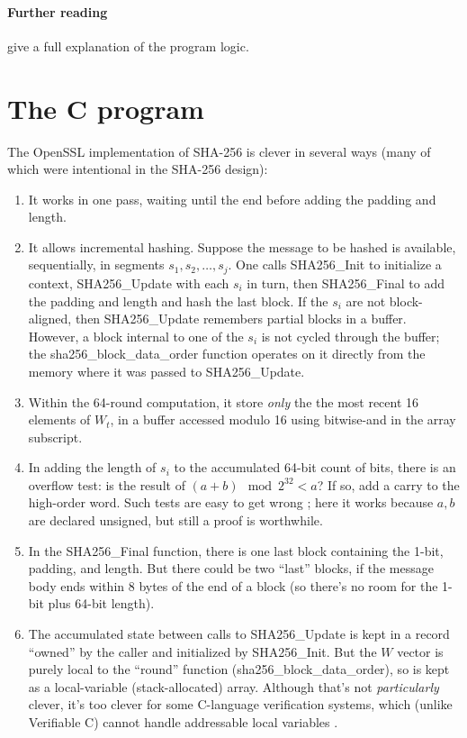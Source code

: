 \documentclass[prodmode,acmtoplas]{acmsmall}
\begin{document}
\paragraph{Further reading}
 give a full explanation of
the program logic.

\section{The C program}

The OpenSSL implementation of SHA-256 is clever
in several ways (many of which were 
intentional in the SHA-256 design):
\begin{enumerate}
\item It works in one pass, waiting until the end
before adding the padding and length.
\item It allows incremental hashing.  Suppose
the message to be hashed is available,
sequentially, in segments $s_1,s_2,\ldots,s_j$.
One calls \textsf{SHA256\_Init} to initialize
a context, \textsf{SHA256\_Update} with
each $s_i$ in turn, then
\textsf{SHA256\_Final} to add the padding
and length and hash the last block.
If the $s_i$ are not block-aligned,
then \textsf{SHA256\_Update} remembers
partial blocks in a buffer.  However,
a block internal to one of the $s_i$ is
not cycled through the buffer; the 
\textsf{sha256\_block\_data\_order}
function operates on it directly from the
memory where it was passed to 
\textsf{SHA256\_Update}.
\item Within the 64-round computation,
it store \emph{only} the
the most recent 16 elements of $W_t$, 
in a buffer accessed modulo 16
using bitwise-and in the array subscript.
\item In adding the length of $s_i$ to the
accumulated 64-bit count of bits,
there is an overflow test: is the result
of $(a+b)\mod 2^{32} < a$?  If so,
add a carry to the high-order word.  Such tests
are easy to get wrong \cite{wang2013towards};
here it works because $a,b$ are declared
\textsf{unsigned}, but still a proof is worthwhile.
\item In the \textsf{SHA256\_Final}
function, there is one last block
containing the 1-bit, padding, and length.
But there could be two ``last'' blocks, if the message body
ends within 8 bytes of the end of a block
(so there's no room for the 1-bit plus
64-bit length).
\item The accumulated state between
calls to \textsf{SHA256\_Update} is kept
in a record ``owned'' by the caller
and initialized by \textsf{SHA256\_Init}.
But the $W$ vector is purely local
to the ``round'' function
(\textsf{sha256\_block\_data\_order}),
so is kept as a local-variable
(stack-allocated) array.  Although that's not
\emph{particularly} clever, it's too clever
for some C-language verification systems,
which (unlike Verifiable C)
cannot handle addressable local variables
\cite{greenaway2012bridging,carbonneau14:pldi}.
\end{enumerate}
\end{document}
